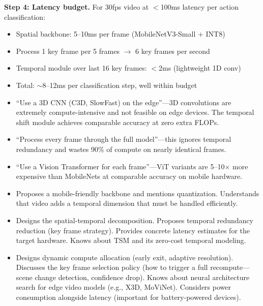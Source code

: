 \begin{interviewq}
\textbf{Step 4: Latency budget.}
For 30fps video at $<$100ms latency per action classification:
\begin{itemize}
    \item Spatial backbone: 5--10ms per frame (MobileNetV3-Small + INT8)
    \item Process 1 key frame per 5 frames $\to$ 6 key frames per second
    \item Temporal module over last 16 key frames: $<$2ms (lightweight 1D conv)
    \item Total: $\sim$8--12ms per classification step, well within budget
\end{itemize}

\redflags
\begin{itemize}
    \item ``Use a 3D CNN (C3D, SlowFast) on the edge''---3D convolutions are extremely compute-intensive and not feasible on edge devices. The temporal shift module achieves comparable accuracy at zero extra FLOPs.
    \item ``Process every frame through the full model''---this ignores temporal redundancy and wastes 90\% of compute on nearly identical frames.
    \item ``Use a Vision Transformer for each frame''---ViT variants are 5--10$\times$ more expensive than MobileNets at comparable accuracy on mobile hardware.
\end{itemize}


\goodgreat
\begin{itemize}
    \item {} Proposes a mobile-friendly backbone and mentions quantization. Understands that video adds a temporal dimension that must be handled efficiently.
    \item {} Designs the spatial-temporal decomposition. Proposes temporal redundancy reduction (key frame strategy). Provides concrete latency estimates for the target hardware. Knows about TSM and its zero-cost temporal modeling.
    \item {} Designs dynamic compute allocation (early exit, adaptive resolution). Discusses the key frame selection policy (how to trigger a full recompute---scene change detection, confidence drop). Knows about neural architecture search for edge video models (e.g., X3D, MoViNet). Considers power consumption alongside latency (important for battery-powered devices).
\end{itemize}

\end{interviewq}
